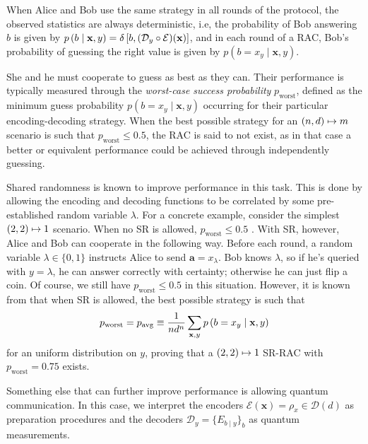            When Alice and Bob use the same strategy in all rounds of the protocol, the observed statistics are always deterministic, i.e, the probability of Bob answering $b$ is given by $p \left( b \mid \mathbf{x}, y \right) = \delta\left[b, (\mathcal{D}_{y} \circ \mathcal{E})(\mathbf{x})\right]$, and in each round of a RAC, Bob's probability of guessing the right value is given by $p(b = x_y \mid \mathbf{x}, y)$.

            She and he must cooperate to guess as best as they can. Their performance is typically measured through the \emph{worst-case success probability} $p_{\text{worst}}$, defined as the minimum guess probability $p(b = x_y \mid \mathbf{x}, y)$ occurring for their particular encoding-decoding strategy. When the best possible strategy for an $\left( n, d \right) \mapsto m$ scenario is such that $p_{\text{worst}} \leq 0.5$, the RAC is said to not exist, as in that case a better or equivalent performance could be achieved through independently guessing.

            Shared randomness is known to improve performance in this task. This is done by allowing the encoding and decoding functions to be correlated by some pre-established random variable $\lambda$. For a concrete example, consider the simplest $\left( 2, 2 \right) \mapsto 1$ scenario. When no SR is allowed, $p_{\text{worst}} \leq 0.5$ \cite{ambainis_qracsoriginal_1999}. With SR, however, Alice and Bob can cooperate in the following way. Before each round, a random variable $\lambda \in \{0, 1\}$ instructs Alice to send $\mathbf{a} = x_\lambda$. Bob knows $\lambda$, so if he's queried with $y = \lambda$, he can answer correctly with certainty; otherwise he can just flip a coin. Of course, we still have $p_{\text{worst}} \leq 0.5$ in this situation. However, it is known from \cite{ambainis_srqracs_2009} that when SR is allowed, the best possible strategy is such that 
            \begin{equation}
                p_{\text{worst}} = p_{\text{avg}} \equiv \frac{1}{nd^n} \sum_{\mathbf{x},y} p \left( b=x_y \mid \mathbf{x},y \right)
                \label{eq:rac-p-avg}
            \end{equation}
            for an uniform distribution on $y$, proving that a $\left( 2, 2 \right) \mapsto 1$ SR-RAC with $p_{\text{worst}} = 0.75$ exists.

            Something else that can further improve performance is allowing quantum communication. In this case, we interpret the encoders $\mathcal{E}(\mathbf{x}) = \rho_x \in \mathcal{D}(d)$ as preparation procedures and the decoders $\mathcal{D}_y = \{ E_{b \mid y} \}_b$ as quantum measurements.


